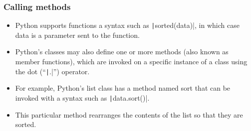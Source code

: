 \begin{frame}
    \frametitle{Calling methods}

    \begin{itemize}
        \item Python supports functions a syntax such as \texttt|sorted(data)|, in which case data is a parameter sent to the function.
        \item Python's classes may also define one or more methods (also known as member functions), which are invoked on a specific instance of a class using the dot (``\texttt|.|'') operator.
        \item For example, Python's list class has a method named sort that can be invoked with a syntax such as \texttt|data.sort()|.
        \item This particular method rearranges the contents of the list so that they are sorted.

    \end{itemize}

\end{frame}

